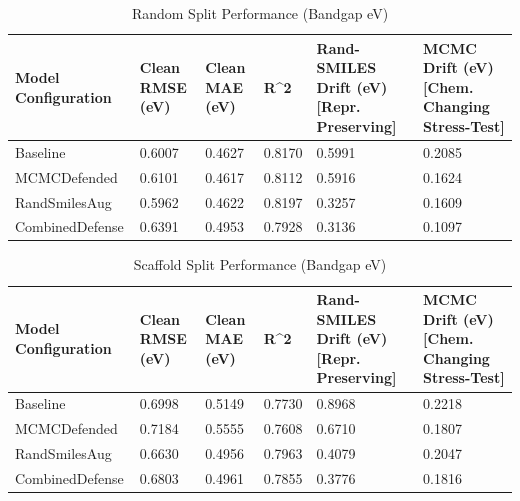 \begin{table}[h]
\centering
\caption{Random Split Performance (Bandgap eV)}
\begin{tabular}{llllll}
\toprule
Model Configuration & Clean RMSE (eV) & Clean MAE (eV) & R^2 & Rand-SMILES Drift (eV) [Repr. Preserving] & MCMC Drift (eV) [Chem. Changing Stress-Test] \\
\midrule
Baseline & 0.6007 & 0.4627 & 0.8170 & 0.5991 & 0.2085 \\
MCMCDefended & 0.6101 & 0.4617 & 0.8112 & 0.5916 & 0.1624 \\
RandSmilesAug & 0.5962 & 0.4622 & 0.8197 & 0.3257 & 0.1609 \\
CombinedDefense & 0.6391 & 0.4953 & 0.7928 & 0.3136 & 0.1097 \\
\bottomrule
\end{tabular}

\end{table}

\begin{table}[h]
\centering
\caption{Scaffold Split Performance (Bandgap eV)}
\begin{tabular}{llllll}
\toprule
Model Configuration & Clean RMSE (eV) & Clean MAE (eV) & R^2 & Rand-SMILES Drift (eV) [Repr. Preserving] & MCMC Drift (eV) [Chem. Changing Stress-Test] \\
\midrule
Baseline & 0.6998 & 0.5149 & 0.7730 & 0.8968 & 0.2218 \\
MCMCDefended & 0.7184 & 0.5555 & 0.7608 & 0.6710 & 0.1807 \\
RandSmilesAug & 0.6630 & 0.4956 & 0.7963 & 0.4079 & 0.2047 \\
CombinedDefense & 0.6803 & 0.4961 & 0.7855 & 0.3776 & 0.1816 \\
\bottomrule
\end{tabular}

\end{table}
